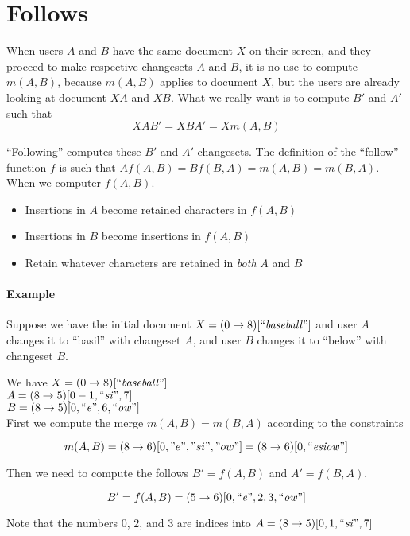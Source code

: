 \documentclass{article}
\begin{document}
\section{Follows} \label{follows}

When users $A$ and $B$ have the same document $X$ on their screen, and they proceed to make respective changesets $A$ and $B$, it is no use to compute $m(A,B)$, because $m(A,B)$ applies to document $X$, but the users are already looking at document $XA$ and $XB$.  What we really want is to compute $B'$ and $A'$ such that
$$XAB' = XBA' = Xm(A,B)$$

``Following'' computes these $B'$ and $A'$ changesets.  The definition of the ``follow'' function $f$ is such that $Af(A,B)=Bf(B,A)=m(A,B)=m(B,A)$.  When we computer $f(A,B)$.
\begin{itemize}
\item Insertions in $A$ become retained characters in $f(A,B)$
\item Insertions in $B$ become insertions in $f(A,B)$
\item Retain whatever characters are retained in \emph{both} $A$ and $B$
\end{itemize}

\paragraph{Example}

Suppose we have the initial document $X=(0\rightarrow 8)[``\mathit{baseball}"]$ and user $A$ changes it to ``basil'' with changeset $A$, and user $B$ changes it to ``below'' with changeset $B$.

We have
$X=(0\rightarrow 8)[``\mathit{baseball}"]$ \\
$A=(8\rightarrow 5)[0-1, ``\mathit{si}", 7]$ \\
$B=(8\rightarrow 5)[0, ``\mathit{e}", 6, ``\mathit{ow}"]$ \\

First we compute the merge $m(A,B)=m(B,A)$ according to the constraints

$$m(A,B)=(8\rightarrow 6)[0, "e", "si", "ow"] = (8\rightarrow 6)[0, ``\mathit{esiow}"]$$

Then we need to compute the follows $B'=f(A,B)$ and $A'=f(B,A)$.

$$B'=f(A,B)=(5\rightarrow 6)[0,``\mathit{e}",2,3,``\mathit{ow}"]$$

Note that the numbers $0$, $2$, and $3$ are indices into $A=(8\rightarrow 5)[0,1,``\mathit{si}",7]$
\end{document}
